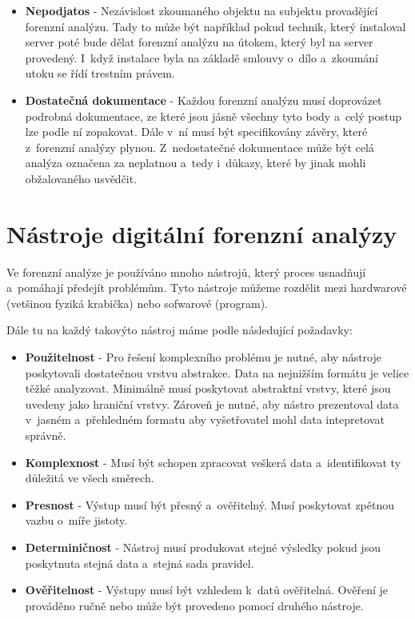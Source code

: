 \documentclass[thesis=B,czech]{FITthesis}[2012/06/26]
\begin{document}
\begin{itemize}
\item \textbf{Nepodjatos} - Nezávislost zkoumaného objektu na subjektu provadějící forenzní analýzu. Tady to může být například pokud technik, který instaloval server poté bude dělat forenzní analýzu na útokem, který byl na server provedený. I~když instalace byla na základě smlouvy o~dílo a~zkoumání utoku se řídí trestním právem. 

\item \textbf{Dostatečná dokumentace} - Každou forenzní analýzu musí doprovázet podrobná dokumentace, ze které jsou jásně všechny tyto body a~celý postup lze podle ní zopakovat. Dále v~ní musí být specifikovány závěry, které z~forenzní analýzy plynou. Z~nedostatečné dokumentace může být celá analýza označena za neplatnou a~tedy i~důkazy, které by jinak mohli obžalovaného usvědčit.

\end{itemize}


\chapter{Nástroje digitální forenzní analýzy} 
\label{body}
Ve forenzní analýze je používáno mnoho nástrojů, který proces usnadňují a~pomáhají předejít problémům. Tyto nástroje můžeme rozdělit mezi hardwarové (vetšinou fyziká krabička) nebo sofwarové (program).

Dále tu na každý takovýto nástroj máme podle \cite{for_need} následující požadavky:

\begin{itemize}
\item \textbf{Použitelnost} - Pro řešení komplexního problému je nutné, aby nástroje poskytovali dostatečnou vrstvu abstrakce. Data na nejnižším formátu je velice těžké analyzovat. Minimálně musí poskytovat abstraktní vrstvy, které jsou uvedeny jako hraniční vrstvy. Zároveň je nutné, aby nástro prezentoval data v~jasném a~přehledném formatu aby vyšetřovatel mohl data intepretovat správně. \cite{carrier2003defining}
\item \textbf{Komplexnost} - Musí být schopen zpracovat veškerá data a~identifikovat ty důležitá ve všech směrech.
\item \textbf{Presnost} - Výstup musí být přesný a~ověřitelný. Musí poskytovat zpětnou vazbu o~míře jistoty.
\item \textbf{Determiničnost} - Nástroj musí produkovat stejné výsledky pokud jsou poskytnuta stejná data a~stejná sada pravidel.
\item \textbf{Ověřitelnost} - Výstupy musí být vzhledem k~datů ověřitelná. Ověření je prováděno ručně nebo může být provedeno pomocí druhého nástroje.
\end{itemize}
\end{document}
